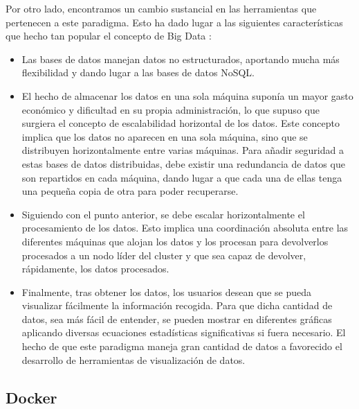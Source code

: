 Por otro lado, encontramos un cambio sustancial en las herramientas que pertenecen a este paradigma. Esto ha dado lugar a las siguientes características que hecho tan popular el concepto de Big Data \cite{BD-6}: 
\begin{itemize}
	\item Las bases de datos manejan datos no estructurados, aportando mucha más flexibilidad y dando lugar a las bases de datos NoSQL.
	\item El hecho de almacenar los datos en una sola máquina suponía un mayor gasto económico y dificultad en su propia administración, lo que supuso que surgiera el concepto de escalabilidad horizontal de los datos. Este concepto implica que los datos no aparecen en una sola máquina, sino que se distribuyen horizontalmente entre varias máquinas. Para añadir seguridad a estas bases de datos distribuidas, debe existir una redundancia de datos que son repartidos en cada máquina, dando lugar a que cada una de ellas tenga una pequeña copia de otra para poder recuperarse.
	\item Siguiendo con el punto anterior, se debe escalar horizontalmente el procesamiento de los datos. Esto implica una coordinación absoluta entre las diferentes máquinas que alojan los datos y los procesan para devolverlos procesados a un nodo líder del cluster y que sea capaz de devolver, rápidamente, los datos procesados.                   
	\item Finalmente, tras obtener los datos, los usuarios desean que se pueda visualizar fácilmente la información recogida. Para que dicha cantidad de datos, sea más fácil de entender, se pueden mostrar en diferentes gráficas aplicando diversas ecuaciones estadísticas significativas si fuera necesario. El hecho de que este paradigma maneja gran cantidad de datos a favorecido el desarrollo de herramientas de visualización de datos. 
\end{itemize}

\subsection{Docker\label{Docker}}


